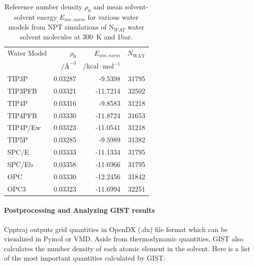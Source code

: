 \documentclass[9pt,tutorial]{livecoms}
\begin{document}
\begin{table}[h]

	\caption{Reference number density $\rho_0$ and mean solvent-solvent energy $E_{ww, norm}$ for various water models from NPT simulations of N$_{WAT}$ water solvent molecules at \SI{300}{\kelvin} and 1bar.}\label{tab:ref_densities}
	\small
	\begin{tabularx}{\columnwidth}{@{}lrrr@{}}
		\toprule
		Water Model       & $\rho_0$ & $E_{ww, norm}$ & $N_\text{WAT}$ \\
        & $/\text{\AA{}}^{-3}$ & $/\text{kcal}\cdot \text{mol}^{-1}$ & \\
		\midrule
		TIP3P \cite{Jorgensen1983-tip3p}    & 0.03287 & -9.5398   & 31795 \\
		TIP3PFB \cite{Wang2014-tip3p-force-balance}  & 0.03321 & -11.7214  & 32502 \\
		TIP4P \cite{Jorgensen1985-tip4p}    & 0.03316 & -9.8583   & 31218 \\
       TIP4PFB \cite{Wang2014-tip3p-force-balance} & 0.03330 & -11.8724   & 31653 \\
		TIP4P/Ew \cite{Horn2004-tip4pew} & 0.03323 & -11.0541  & 31218 \\
		TIP5P \cite{Mahoney2000-tip5p}    & 0.03285 & -9.5989   & 31382 \\
		SPC/E \cite{Berendsen1987-spce}    & 0.03333 & -11.1334  & 31795 \\
       SPC/Eb \cite{Takemura2012-spceb}   & 0.03358 & -11.6966 & 31795 \\
		OPC \cite{Izadi2014-opc}      & 0.03330 & -12.2456 & 31842 \\
		OPC3 \cite{Izadi2016-opc3}     & 0.03323 & -11.6994 & 32251 \\
		\bottomrule
	\end{tabularx}
\end{table}
\pagebreak %
\paragraph{Postprocessing and Analyzing GIST results}
Cpptraj outputs grid quantities in OpenDX (.dx) file format which can be visualized in Pymol or VMD.
Aside from thermodynamic quantities, GIST also calculates the number density of each atomic element in the solvent.
Here is a list of the most important quantities calculated by GIST:
\end{document}
